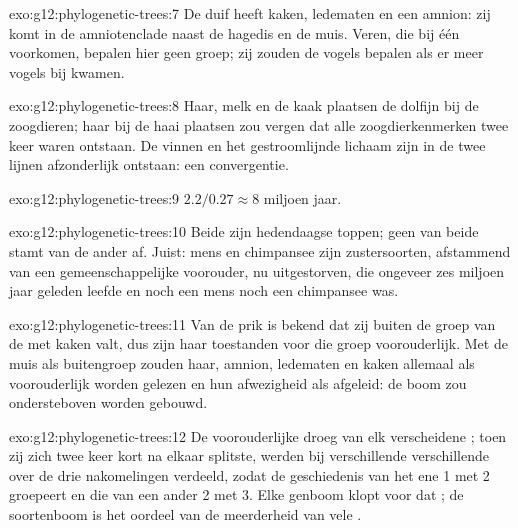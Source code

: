 \begin{solution}{exo:g12:phylogenetic-trees:7}
De duif heeft kaken, ledematen en een amnion: zij komt in de amniotenclade
naast de hagedis en de muis. Veren, die bij één  voorkomen, bepalen
hier geen groep; zij zouden de vogels bepalen als er meer vogels bij
kwamen.
\end{solution}

\begin{solution}{exo:g12:phylogenetic-trees:8}
Haar, melk en de kaak plaatsen de dolfijn bij de zoogdieren; haar bij de
haai plaatsen zou vergen dat alle zoogdierkenmerken twee keer waren
ontstaan. De vinnen en het gestroomlijnde lichaam zijn in de twee lijnen
afzonderlijk ontstaan: een convergentie.
\end{solution}

\begin{solution}{exo:g12:phylogenetic-trees:9}
$2.2/0.27 \approx 8$ miljoen jaar.
\end{solution}

\begin{solution}{exo:g12:phylogenetic-trees:10}
Beide zijn hedendaagse toppen; geen van beide stamt van de ander af.
Juist: mens en chimpansee zijn zustersoorten, afstammend van een
gemeenschappelijke voorouder, nu uitgestorven, die ongeveer zes miljoen
jaar geleden leefde en noch een mens noch een chimpansee was.
\end{solution}

\begin{solution}{exo:g12:phylogenetic-trees:11}
Van de prik is bekend dat zij buiten de groep van de  met kaken
valt, dus zijn haar toestanden voor die groep voorouderlijk. Met de muis
als buitengroep zouden haar, amnion, ledematen en kaken allemaal als
voorouderlijk worden gelezen en hun afwezigheid als afgeleid: de boom zou
ondersteboven worden gebouwd.
\end{solution}

\begin{solution}{exo:g12:phylogenetic-trees:12}
De voorouderlijke  droeg van elk  verscheidene ; toen
zij zich twee keer kort na elkaar splitste, werden bij verschillende 
verschillende  over de drie nakomelingen verdeeld, zodat de
geschiedenis van het ene   1 met 2 groepeert en die van een ander
 2 met 3. Elke genboom klopt voor dat ; de soortenboom is het
oordeel van de meerderheid van vele .
\end{solution}

